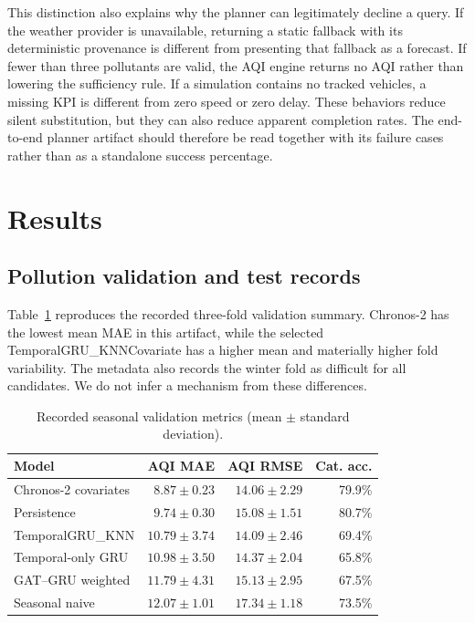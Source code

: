 \documentclass[conference]{IEEEtran}
\begin{document}
This distinction also explains why the planner can legitimately decline a query. If the weather provider is unavailable, returning a static fallback with its deterministic provenance is different from presenting that fallback as a forecast. If fewer than three pollutants are valid, the AQI engine returns no AQI rather than lowering the sufficiency rule. If a simulation contains no tracked vehicles, a missing KPI is different from zero speed or zero delay. These behaviors reduce silent substitution, but they can also reduce apparent completion rates. The end-to-end planner artifact should therefore be read together with its failure cases rather than as a standalone success percentage.

\section{Results}
\label{sec:results}
\subsection{Pollution validation and test records}
Table~\ref{tab:cv} reproduces the recorded three-fold validation summary. Chronos-2 has the lowest mean MAE in this artifact, while the selected TemporalGRU\_KNNCovariate has a higher mean and materially higher fold variability. The metadata also records the winter fold as difficult for all candidates. We do not infer a mechanism from these differences.

\begin{table}[t]
\caption{Recorded seasonal validation metrics (mean $\pm$ standard deviation).}
\label{tab:cv}
\centering\scriptsize
\begin{tabular}{@{}lrrr@{}}
\toprule
Model & AQI MAE & AQI RMSE & Cat. acc.\\
\midrule
Chronos-2 covariates & $8.87\pm0.23$ & $14.06\pm2.29$ & 79.9\%\\
Persistence & $9.74\pm0.30$ & $15.08\pm1.51$ & 80.7\%\\
TemporalGRU\_KNN & $10.79\pm3.74$ & $14.09\pm2.46$ & 69.4\%\\
Temporal-only GRU & $10.98\pm3.50$ & $14.37\pm2.04$ & 65.8\%\\
GAT--GRU weighted & $11.79\pm4.31$ & $15.13\pm2.95$ & 67.5\%\\
Seasonal naive & $12.07\pm1.01$ & $17.34\pm1.18$ & 73.5\%\\
\bottomrule
\end{tabular}
\end{table}
\end{document}
